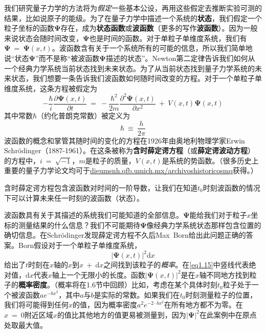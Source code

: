 \documentclass[12pt,a4paper,openany]{ctexbook}
\begin{document}
\begin{flushleft}
我们研究量子力学的方法将为\textit{假定}一些基本公设，再用这些假定去推断实验可测的结果，比如说原子的能级。为了在量子力学中描述一个系统的\textbf{状态}，我们假定一个粒子坐标的函数$\mathbf{\Psi}$存在，成为\textbf{状态函数}或\textbf{波函数}（更多的写作\textbf{波函数}）。因为一般来说状态会随时间改变，$\bm{\Psi}$也是时间的函数。对于单粒子单维度系统，我们有$\bm{\Psi}\ =\ \bm{\Psi}(x,t)$。波函数含有关于一个系统所有的可能的信息，所以我们简单地说“状态$\bm{\Psi}$”而不是称“被波函数$\bm{\Psi}$描述的状态”。Newton第二定律告诉我们如何从一个经典力学系统当前状态找到未来状态。为了从当前状态找到量子力学系统的未来状态，我们想要一条告诉我们波函数如何随时间改变的方程。对于一个单粒子单维度系统，这条方程被假定为
\begin{equation}
    -\frac{\hbar}{i}\frac{\partial\bm{\Psi}(x,t)}{\partial t}\ =\ -\frac{\hbar^2}{2m}\frac{\partial^2\bm{\Psi}(x,t)}{\partial x^2}\ +\ V(x,t)\bm{\Psi}(x,t)
    \label{eq1.13}
\end{equation}
其中常数$\hbar$（约化普朗克常数）被定义为
\begin{equation}
    \boxed{\hbar\ \equiv\ \frac{h}{2\pi}}
\end{equation}
波函数的概念和掌管其随时间的变化的方程在1926年由奥地利物理学家Erwin Schr\"odinger（1887-1961）。在这条被称为\textbf{含时薛定谔方程}（或\textbf{薛定谔波动方程}）的方程中，$i\ =\ \sqrt{-1}$，$m$是粒子的质量，$V(x,t)$是系统的势函数。（很多历史上重要的量子力学论文均可于\url{dieumsnh.qfb.umich.mx/archivoshistoricosmq}获得。）

含时薛定谔方程包含波函数对时间的一阶导数，让我们在知道$t_0$时刻波函数的情况下可以计算未来任一时刻的波函数（状态）。

波函数具有关于其描述的系统我们可能知道的全部信息。$\bm{\Psi}$能给我们对于粒子$x$坐标的测量结果的什么信息？我们不可能期待$\bm{\Psi}$像经典力学系统状态那样包含位置的确切信息。在Schr\"odinger发现薛定谔方程不久后Max\ Born给出此问题正确的答案。Born假设对于一个单粒子单维度系统，
\begin{equation}
    \boxed{\left|\bm{\Psi}(x,t)\right|^2\mathrm{d}x}
    \label{eq1.15}
\end{equation}
给出了$t$时刻在$x$轴的$x$到$x\ +\ \mathrm{d}x$之间找到该粒子的\textit{概率}。在\eqref{eq1.15}中竖线代表绝对值，$\mathrm{d}x$代表$x$轴上一个无限小的长度。函数$\left|\bm{\Psi}(x,t)\right|^2$是在$x$轴不同地方找到粒子的\textbf{概率密度}。（概率将在1.6节中回顾）比如，考虑在某个具体时刻$t_0$粒子处于一个被波函数$ae^{-bx^2}$，其中$a$与$b$是实际的常数。如果我们在$t_0$时刻测量粒子的位置，我们将可能得到任何$x$的值，因为概率密度$a^2e^{-2\cdot bx^2}$在所有地方都不为零。在$x\ =\ 0$附近区域$x$的值比其他地方的值更易被测量到，因为$\left|\bm{\Psi}\right|^2$在此案例中在原点处取最大值。


\end{flushleft}
\end{document}
